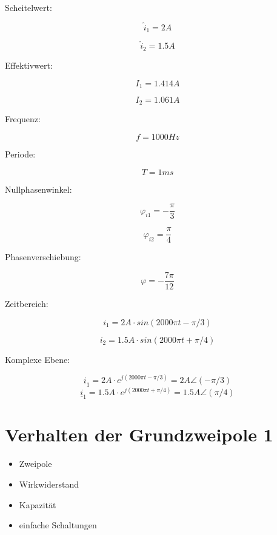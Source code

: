 \documentclass[
  ngerman,
  letterpaper,
]{scrbook}
\providecommand{\tightlist}{%
  \setlength{\itemsep}{0pt}\setlength{\parskip}{0pt}}
\begin{document}
\begin{tcolorbox}[enhanced jigsaw, titlerule=0mm, rightrule=.15mm, toprule=.15mm, colback=white, toptitle=1mm, bottomrule=.15mm, coltitle=black, leftrule=.75mm, arc=.35mm, colbacktitle=quarto-callout-caution-color!10!white, opacityback=0, bottomtitle=1mm, colframe=quarto-callout-caution-color-frame, opacitybacktitle=0.6, breakable, title=\textcolor{quarto-callout-caution-color}{\faFire}\hspace{0.5em}{Lösung 4.4}, left=2mm]

Scheitelwert:

\[\hat{i}_1 = 2A\]

\[\hat{i}_2 = 1.5A\]

Effektivwert:

\[I_1 = 1.414A\]

\[I_2 = 1.061A\]

Frequenz:

\[f = 1000Hz\]

Periode:

\[T = 1ms\]

Nullphasenwinkel:

\[\varphi_{i1} = -\frac{\pi}{3}\]

\[\varphi_{i2} = \frac{\pi}{4}\]

Phasenverschiebung:

\[\varphi = -\frac{7\pi}{12}\]

Zeitbereich:

\[i_1 = 2A \cdot sin(2000\pi t - \pi/3)\]

\[i_2 = 1.5A \cdot sin(2000\pi t + \pi/4)\]

Komplexe Ebene:

\[ \underline{i}_1 = 2A \cdot e^{j(2000\pi t - \pi/3)} = 2A \angle(-\pi/3)\]
\[ \underline{i}_1 = 1.5A \cdot e^{j(2000\pi t + \pi/4)} = 1.5A \angle(\pi/4)\]

\end{tcolorbox}

\chapter{Verhalten der Grundzweipole
1}\label{verhalten-der-grundzweipole-1}

\begin{itemize}
\tightlist
\item
  Zweipole
\item
  Wirkwiderstand
\item
  Kapazität
\item
  einfache Schaltungen
\end{itemize}
\end{document}
